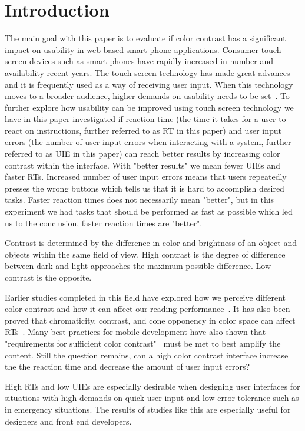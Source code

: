 \documentclass[runningheads,a4paper]{llncs}
\begin{document}
\section{Introduction}
The main goal with this paper is to evaluate if color contrast has a significant impact on usability in web based smart-phone applications. Consumer touch screen devices such as smart-phones have rapidly increased in number and availability recent years. The touch screen technology has made great advances~\cite{jennings2013touch} and it is frequently used as a way of receiving user input. When this technology moves to a broader audience, higher demands on usability needs to be set~\cite{gong2004guidelines}. To further explore how usability can be improved using touch screen technology we have in this paper investigated if reaction time (the time it takes for a user to react on instructions, further referred to as RT in this paper) and user input errors (the number of user input errors when interacting with a system, further referred to as UIE in this paper) can reach better results by increasing color contrast within the interface. With "better results" we mean fewer UIEs and faster RTs. Increased number of user input errors means that users repeatedly presses the wrong buttons which tells us that it is hard to accomplish desired tasks. Faster reaction times does not necessarily mean "better", but in this experiment we had tasks that should be performed as fast as possible which led us to the conclusion, faster reaction times are "better".

Contrast is determined by the difference in color and brightness of an object and objects within the same field of view. High contrast is the degree of difference between dark and light approaches the maximum possible difference. Low contrast is the opposite. 

Earlier studies completed in this field have explored how we perceive different color contrast and how it can affect our reading performance~\cite{wu2003improving}. It has also been proved that chromaticity, contrast, and cone opponency in color space can affect RTs~\cite{mckeefry2003simple}. Many best practices for mobile development have also shown that "requirements for sufficient color contrast"~\cite{marcus2013design} must be met to best amplify the content. Still the question remains, can a high color contrast interface increase the the reaction time and decrease the amount of user input errors?

High RTs and low UIEs are especially desirable when designing user interfaces for situations with high demands on quick user input and low error tolerance such as in emergency situations. The results of studies like this are especially useful for designers and front end developers.
\end{document}
